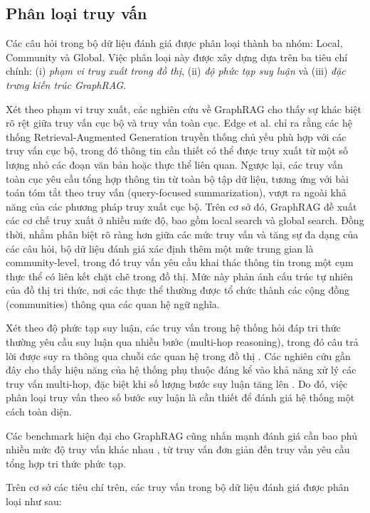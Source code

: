 \subsection{Phân loại truy vấn}
\label{sec:query_classification}

Các câu hỏi trong bộ dữ liệu đánh giá được phân loại thành ba nhóm: Local, Community và Global. Việc phân loại này được xây dựng dựa trên ba tiêu chí chính: (i) \textit{phạm vi truy xuất trong đồ thị}, (ii) \textit{độ phức tạp suy luận } và (iii) \textit{đặc trưng kiến trúc GraphRAG}.

Xét theo phạm vi truy xuất, các nghiên cứu về GraphRAG cho thấy sự khác biệt rõ rệt giữa truy vấn cục bộ và truy vấn toàn cục. Edge et al. \cite{edge2024graphrag} chỉ ra rằng các hệ thống Retrieval-Augmented Generation truyền thống chủ yếu phù hợp với các truy vấn cục bộ, trong đó thông tin cần thiết có thể được truy xuất từ một số lượng nhỏ các đoạn văn bản hoặc thực thể liên quan. Ngược lại, các truy vấn toàn cục yêu cầu tổng hợp thông tin từ toàn bộ tập dữ liệu, tương ứng với bài toán tóm tắt theo truy vấn (query-focused summarization), vượt ra ngoài khả năng của các phương pháp truy xuất cục bộ. Trên cơ sở đó, GraphRAG đề xuất các cơ chế truy xuất ở nhiều mức độ, bao gồm local search và global search. Đồng thời, nhằm phân biệt rõ ràng hơn giữa các mức truy vấn và tăng sự đa dạng của các câu hỏi, bộ dữ liệu đánh giá xác định thêm một mức trung gian là community-level, trong đó truy vấn yêu cầu khai thác thông tin trong một cụm thực thể có liên kết chặt chẽ trong đồ thị. Mức này phản ánh cấu trúc tự nhiên của đồ thị tri thức, nơi các thực thể thường được tổ chức thành các cộng đồng (communities) thông qua các quan hệ ngữ nghĩa.

Xét theo độ phức tạp suy luận, các truy vấn trong hệ thống hỏi đáp tri thức thường yêu cầu suy luận qua nhiều bước (multi-hop reasoning), trong đó câu trả lời được suy ra thông qua chuỗi các quan hệ trong đồ thị \cite{wang2023multihop}. Các nghiên cứu gần đây cho thấy hiệu năng của hệ thống phụ thuộc đáng kể vào khả năng xử lý các truy vấn multi-hop, đặc biệt khi số lượng bước suy luận tăng lên \cite{shah2024multihop}. Do đó, việc phân loại truy vấn theo số bước suy luận là cần thiết để đánh giá hệ thống một cách toàn diện.

Các benchmark hiện đại cho GraphRAG cũng nhấn mạnh đánh giá cần bao phủ nhiều mức độ truy vấn khác nhau \cite{peng2025m3gqa}, từ truy vấn đơn giản đến truy vấn yêu cầu tổng hợp tri thức phức tạp.

Trên cơ sở các tiêu chí trên, các truy vấn trong bộ dữ liệu đánh giá được phân loại như sau:

